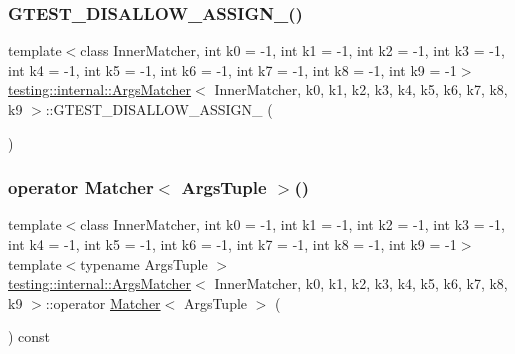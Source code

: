\subsubsection{\texorpdfstring{G\+T\+E\+S\+T\+\_\+\+D\+I\+S\+A\+L\+L\+O\+W\+\_\+\+A\+S\+S\+I\+G\+N\+\_\+()}{GTEST\_DISALLOW\_ASSIGN\_()}}
{\footnotesize\ttfamily template$<$class Inner\+Matcher, int k0 = -\/1, int k1 = -\/1, int k2 = -\/1, int k3 = -\/1, int k4 = -\/1, int k5 = -\/1, int k6 = -\/1, int k7 = -\/1, int k8 = -\/1, int k9 = -\/1$>$ \\
\hyperlink{classtesting_1_1internal_1_1ArgsMatcher}{testing\+::internal\+::\+Args\+Matcher}$<$ Inner\+Matcher, k0, k1, k2, k3, k4, k5, k6, k7, k8, k9 $>$\+::G\+T\+E\+S\+T\+\_\+\+D\+I\+S\+A\+L\+L\+O\+W\+\_\+\+A\+S\+S\+I\+G\+N\+\_\+ (\begin{DoxyParamCaption}\item[{\hyperlink{classtesting_1_1internal_1_1ArgsMatcher}{Args\+Matcher}$<$ Inner\+Matcher, k0, k1, k2, k3, k4, k5, k6, k7, k8, k9 $>$}]{ }\end{DoxyParamCaption})\hspace{0.3cm}{\ttfamily [private]}}

\mbox{\label{classtesting_1_1internal_1_1ArgsMatcher_ad55698b0de384a9d8875cef5b172cb4a}} 
\subsubsection{\texorpdfstring{operator Matcher$<$ Args\+Tuple $>$()}{operator Matcher< ArgsTuple >()}}
{\footnotesize\ttfamily template$<$class Inner\+Matcher, int k0 = -\/1, int k1 = -\/1, int k2 = -\/1, int k3 = -\/1, int k4 = -\/1, int k5 = -\/1, int k6 = -\/1, int k7 = -\/1, int k8 = -\/1, int k9 = -\/1$>$ \\
template$<$typename Args\+Tuple $>$ \\
\hyperlink{classtesting_1_1internal_1_1ArgsMatcher}{testing\+::internal\+::\+Args\+Matcher}$<$ Inner\+Matcher, k0, k1, k2, k3, k4, k5, k6, k7, k8, k9 $>$\+::operator \hyperlink{classtesting_1_1Matcher}{Matcher}$<$ Args\+Tuple $>$ (\begin{DoxyParamCaption}{ }\end{DoxyParamCaption}) const\hspace{0.3cm}{\ttfamily [inline]}}



